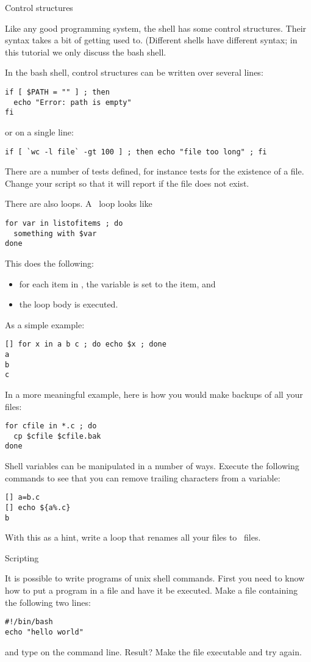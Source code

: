 
 {Control structures}
\label{sec:shell-control}

Like any good programming system, the shell has some control
structures. Their syntax takes a bit of getting used to. (Different
shells have different syntax; in this tutorial we only discuss the
bash shell.

In the bash shell, control structures can be written over several
lines:
\begin{verbatim}
if [ $PATH = "" ] ; then
  echo "Error: path is empty"
fi
\end{verbatim}
or on a single line:
\begin{verbatim}
if [ `wc -l file` -gt 100 ] ; then echo "file too long" ; fi
\end{verbatim}
There are a number of tests defined, for instance 
tests for the existence of a file. Change your script so that it will
report  if the file does not exist.

There are also loops. A~ loop looks like
\begin{verbatim}
for var in listofitems ; do
  something with $var
done
\end{verbatim}
This does the following:
\begin{itemize}
\item for each item in , the variable  is set to the
  item, and
\item the loop body is executed.
\end{itemize}
As a simple example:
\begin{verbatim}
[] for x in a b c ; do echo $x ; done
a
b
c
\end{verbatim}
In a more meaningful example,
here is how you would make backups of all your~
files:
\begin{verbatim}
for cfile in *.c ; do
  cp $cfile $cfile.bak
done
\end{verbatim}
Shell variables can be manipulated in a number of ways.
Execute the following commands to see that you can remove trailing
characters from a variable:
\begin{verbatim}
[] a=b.c
[] echo ${a%.c}
b
\end{verbatim}
With this as a hint, write a loop that renames all your  files
to~ files.

 {Scripting}
\label{sec:shell-scripting}

It is possible to write programs of unix shell commands. First you
need to know how to put a program in a file and have it be
executed. Make a file  containing the following two lines:
\begin{verbatim}
#!/bin/bash
echo "hello world"
\end{verbatim}
and type  on the command line. Result?
Make the file executable and try again.

